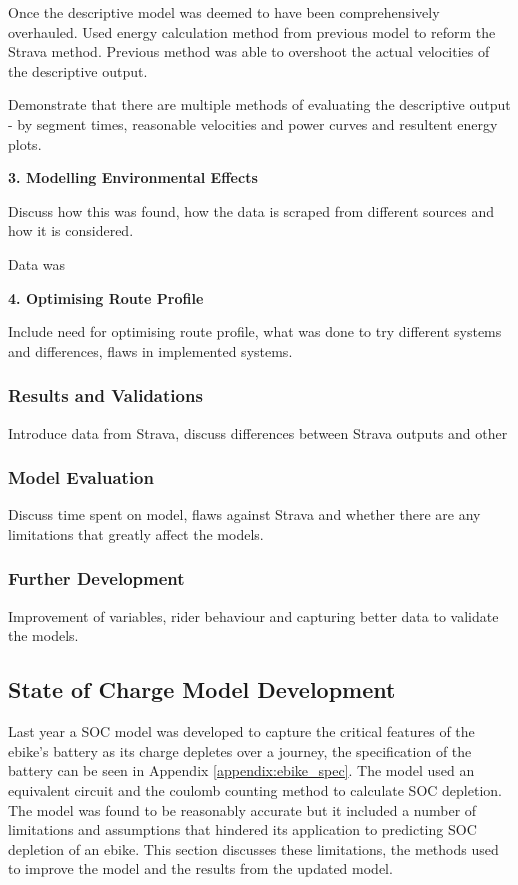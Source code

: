 \documentclass[a4paper, 10pt]{article}
\numberwithin{equation}{section}
\begin{document}
Once the descriptive model was deemed to have been comprehensively overhauled. Used energy calculation method from previous model to reform the Strava method. Previous method was able to overshoot the actual velocities of the descriptive output.

Demonstrate that there are multiple methods of evaluating the descriptive output - by segment times, reasonable velocities and power curves and resultent energy plots.

\textbf{3. Modelling Environmental Effects}

Discuss how this was found, how the data is scraped from different sources and how it is considered.

Data was 

\textbf{4. Optimising Route Profile}

Include need for optimising route profile, what was done to try different systems and differences, flaws in implemented systems. 

\subsubsection{Results and Validations}

Introduce data from Strava, discuss differences between Strava outputs and other 

\subsubsection{Model Evaluation}

Discuss time spent on model, flaws against Strava and whether there are any limitations that greatly affect the models.

\subsubsection{Further Development}

Improvement of variables, rider behaviour and capturing better data to validate the models.

\newpage

\subsection{State of Charge Model Development}
\label{sec:SOC}

Last year a SOC model was developed to capture the critical features of the ebike's battery as its charge depletes over a journey, the specification of the battery can be seen in Appendix \ref{appendix:ebike_spec}. The model used an equivalent circuit and the coulomb counting method to calculate SOC depletion. The model was found to be reasonably accurate but it included a number of limitations and assumptions that hindered its application to predicting SOC depletion of an ebike. This section discusses these limitations, the methods used to improve the model and the results from the updated model.
\end{document}
